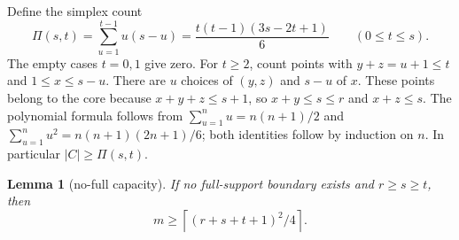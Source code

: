 \documentclass[11pt]{article}
\newtheorem{lemma}[theorem]{Lemma}
\theoremstyle{definition}
\theoremstyle{remark}
\theoremstyle{plain}
\begin{document}
Define the simplex count
\[
\Pi(s,t)=\sum_{u=1}^{t-1}u(s-u)
=\frac{t(t-1)(3s-2t+1)}6\qquad(0\le t\le s).
\]
The empty cases \(t=0,1\) give zero. For \(t\ge2\), count points with \(y+z=u+1\le t\) and \(1\le x\le s-u\). There are \(u\) choices of \((y,z)\) and \(s-u\) of \(x\). These points belong to the core because \(x+y+z\le s+1\), so \(x+y\le s\le r\) and \(x+z\le s\). The polynomial formula follows from \(\sum_{u=1}^{n}u=n(n+1)/2\) and \(\sum_{u=1}^{n}u^2=n(n+1)(2n+1)/6\); both identities follow by induction on \(n\). In particular \(|C|\ge \Pi(s,t)\).

\begin{lemma}[no-full capacity]\label{res:A.22}\label{res:A.23}
If no full-support boundary exists and $r\ge s\ge t$, then
\[
 m\ge\left\lceil(r+s+t+1)^2/4\right\rceil.
\]
\end{lemma}
\end{document}
